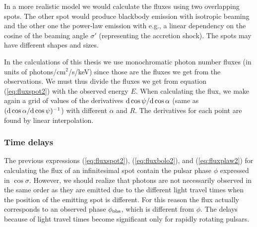 \documentclass{wihuri}
\def\msun{{\rm M_{\odot}}}
\def\d{{\rm d}}
\def\phiobs{\phi_{\rm obs}}
\begin{document}
In a more realistic model we would calculate the fluxes using two overlapping spots. The other spot would produce blackbody emission with isotropic beaming and the other one the power-law emission with e.g., a linear dependency on the cosine of the beaming angle $\sigma'$ (representing the accretion shock). The spots may have different shapes and sizes. %


In the calculations of this thesis we use monochromatic photon number fluxes (in units of photons/cm$^{2}$/s/keV) since those are the fluxes we get from the observations. We must thus divide the fluxes we get from equation (\ref{eq:fluxspot2}) with the observed energy $E$. When calculating the flux, we make again a grid of values of the derivatives $\d\cos\psi / \d\cos\alpha$ (same as $(\d\cos\alpha / \d\cos\psi)^{-1}$) with different $\alpha$ and $R$. The derivatives for each point are found by linear interpolation. 


\subsubsection{Time delays}



The previous expressions (\ref{eq:fluxspot2}), (\ref{eq:fluxbolo2}), and (\ref{eq:fluxplaw2}) for calculating the flux of an infinitesimal spot
contain the pulsar phase $\phi$ expressed in $\cos\sigma$. However, we should realize that photons are not necessarily observed in the same order as they are emitted due to the different light travel times when the position of the emitting spot is different. For this reason the flux actually corresponds to an observed phase $\phiobs$, which is different from $\phi$. The delays because of light travel times become significant only for rapidly rotating pulsars. %

   
\end{document}
